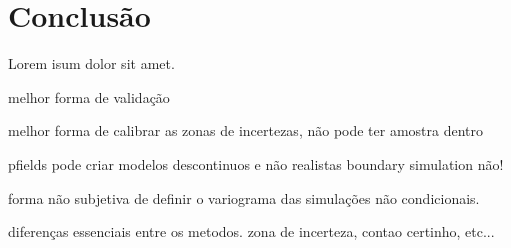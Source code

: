 \chapter{Conclusão}

Lorem isum dolor sit amet.

melhor forma de validação 

melhor forma de calibrar as zonas de incertezas, não pode ter amostra dentro

pfields pode criar modelos descontinuos e não realistas boundary simulation não!

forma não subjetiva de definir o variograma das simulações não condicionais.

diferenças essenciais entre os metodos. zona de incerteza, contao certinho, etc...